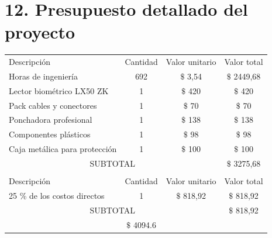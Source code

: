 \documentclass[
11pt, %
]{charter}
\begin{document}
\section{12. Presupuesto detallado del proyecto}
\label{sec:presupuesto}


\begin{table}[htpb]
\centering
\begin{tabularx}{\linewidth}{@{}|X|c|r|r|@{}}
\hline
\rowcolor[HTML]{C0C0C0} 
\multicolumn{4}{|c|}{\cellcolor[HTML]{C0C0C0}COSTOS DIRECTOS} \\ \hline
\rowcolor[HTML]{C0C0C0} 
Descripción &
  \multicolumn{1}{c|}{\cellcolor[HTML]{C0C0C0}Cantidad} &
  \multicolumn{1}{c|}{\cellcolor[HTML]{C0C0C0}Valor unitario} &
  \multicolumn{1}{c|}{\cellcolor[HTML]{C0C0C0}Valor total} \\ \hline
 Horas de ingeniería &
  \multicolumn{1}{c|}{692} &
  \multicolumn{1}{c|}{$\$$ 3,54} &
  \multicolumn{1}{c|}{$\$$ 2449,68} \\ \hline
 Lector biométrico LX50 ZK &
  \multicolumn{1}{c|}{1} &
  \multicolumn{1}{c|}{$\$$ 420} &
  \multicolumn{1}{c|}{$\$$ 420} \\ \hline
\multicolumn{1}{|l|}{Pack cables y conectores} &
	1
   & \multicolumn{1}{c|}{$\$$ 70}
   & \multicolumn{1}{c|}{$\$$ 70}
   \\ \hline
\multicolumn{1}{|l|}{Ponchadora profesional} & 1
   & \multicolumn{1}{c|}{$\$$ 138}
   & \multicolumn{1}{c|}{$\$$ 138}
   \\ \hline
\multicolumn{1}{|l|}{Componentes plásticos} & 1
   & \multicolumn{1}{c|}{$\$$ 98}
   & \multicolumn{1}{c|}{$\$$ 98}
   \\ \hline
\multicolumn{1}{|l|}{Caja metálica para protección} & 1
   & \multicolumn{1}{c|}{$\$$ 100}
   & \multicolumn{1}{c|}{$\$$ 100}
   \\ \hline
\multicolumn{3}{|c|}{SUBTOTAL} & 
  \multicolumn{1}{c|}{$\$$ 3275,68} \\ \hline
\rowcolor[HTML]{C0C0C0} 
\multicolumn{4}{|c|}{\cellcolor[HTML]{C0C0C0}COSTOS INDIRECTOS} \\ \hline
\rowcolor[HTML]{C0C0C0} 
Descripción &
  \multicolumn{1}{c|}{\cellcolor[HTML]{C0C0C0}Cantidad} &
  \multicolumn{1}{c|}{\cellcolor[HTML]{C0C0C0}Valor unitario} &
  \multicolumn{1}{c|}{\cellcolor[HTML]{C0C0C0}Valor total} \\ \hline
\multicolumn{1}{|l|}{25 \% de los costos directos} & 1
   & \multicolumn{1}{c|}{$\$$ 818,92}
   & \multicolumn{1}{c|}{$\$$ 818,92}
   \\ \hline
\multicolumn{3}{|c|}{SUBTOTAL} &
  \multicolumn{1}{c|}{$\$$ 818,92} \\ \hline
\rowcolor[HTML]{C0C0C0}
\multicolumn{3}{|c|}{TOTAL} & \multicolumn{1}{c|}{$\$$ 4094.6}
   \\ \hline
\end{tabularx}%
\end{table}
\end{document}
